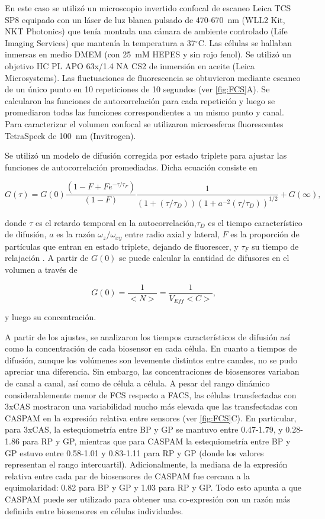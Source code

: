 En este caso se utilizó un microscopio invertido confocal de escaneo Leica TCS SP8 equipado con un láser de luz blanca pulsado de 470-670~nm (WLL2 Kit, NKT Photonics) que tenía montada una cámara de ambiente controlado (Life Imaging Services) que mantenía la temperatura a 37$^{\circ}$C. Las células se hallaban inmersas en medio DMEM (con 25~mM HEPES y sin rojo fenol). Se utilizó un objetivo HC PL APO 63x/1.4 NA CS2 de inmersión en aceite (Leica Microsystems). Las fluctuaciones de fluorescencia se obtuvieron mediante escaneo de un único punto en 10 repeticiones de 10 segundos (ver \cref{fig:FCS}A). Se calcularon las funciones de autocorrelación para cada repetición y luego se promediaron todas las funciones correspondientes a un mismo punto y canal. Para caracterizar el volumen confocal se utilizaron microesferas fluorescentes TetraSpeck de 100~nm (Invitrogen).

Se utilizó un modelo de difusión corregida por estado triplete para ajustar las funciones de autocorrelación promediadas. Dicha ecuación consiste en

\begin{equation}
    G (\tau) = G(0) \frac{(1 - F + F e^{-\tau/\tau_F})}{(1-F)} \frac{1}{(1 + (\tau / \tau_{D})) (1 + a^{-2} (\tau / \tau_{D}))^{1/2}} + G(\infty),
\end{equation}

\noindent donde $\tau$ es el retardo temporal en la autocorrelación,$\tau_D$ es el tiempo característico de difusión, $a$ es la razón $\omega_z / \omega_{xy}$ entre radio axial y lateral, $F$ es la proporción de partículas que entran en estado triplete, dejando de fluorescer, y $\tau_F$ su tiempo de relajación \citep{Widengren1995}. A partir de $G(0)$ se puede calcular la cantidad de difusores en el volumen a través de

\begin{equation}
    G(0) = \frac{1}{<N>} = \frac{1}{V_{Eff} <C>},
\end{equation}

\noindent y luego su concentración.

A partir de los ajustes, se analizaron los tiempos característicos de difusión así como la concentración de cada biosensor en cada célula. En cuanto a tiempos de difusión, aunque los volúmenes son levemente distintos entre canales, no se pudo apreciar una diferencia. Sin embargo, las concentraciones de biosensores variaban de canal a canal, así como de célula a célula. A pesar del rango dinámico considerablemente menor de FCS respecto a FACS, las células transfectadas con 3xCAS mostraron una variabilidad mucho más elevada que las transfectadas con CASPAM en la expresión relativa entre sensores (ver \cref{fig:FCS}C). En particular, para  3xCAS, la estequiometría entre BP y GP se mantuvo entre 0.47-1.79, y 0.28-1.86 para RP y GP, mientras que para CASPAM la estequiometría entre BP y GP estuvo entre 0.58-1.01 y 0.83-1.11 para RP y GP (donde los valores representan el rango intercuartil). Adicionalmente, la mediana de la expresión relativa entre cada par de biosensores de CASPAM fue cercana a la equimolaridad: 0.82 para BP y GP y 1.03 para RP y GP. Todo esto apunta a que CASPAM puede ser utilizado para obtener una co-expresión con un razón más definida entre biosensores en células individuales.


